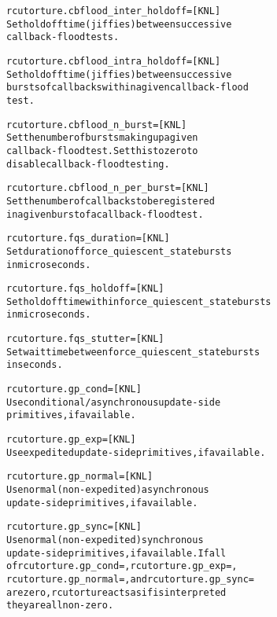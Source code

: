 \documentclass[a4paper,8pt,english]{sphinxmanual}
\begin{document}
\begin{alltt}
        rcutorture.cbflood\_inter\_holdoff= {[}KNL{]}
                        Set holdoff time (jiffies) between successive
                        callback-flood tests.

        rcutorture.cbflood\_intra\_holdoff= {[}KNL{]}
                        Set holdoff time (jiffies) between successive
                        bursts of callbacks within a given callback-flood
                        test.

        rcutorture.cbflood\_n\_burst= {[}KNL{]}
                        Set the number of bursts making up a given
                        callback-flood test.  Set this to zero to
                        disable callback-flood testing.

        rcutorture.cbflood\_n\_per\_burst= {[}KNL{]}
                        Set the number of callbacks to be registered
                        in a given burst of a callback-flood test.

        rcutorture.fqs\_duration= {[}KNL{]}
                        Set duration of force\_quiescent\_state bursts
                        in microseconds.

        rcutorture.fqs\_holdoff= {[}KNL{]}
                        Set holdoff time within force\_quiescent\_state bursts
                        in microseconds.

        rcutorture.fqs\_stutter= {[}KNL{]}
                        Set wait time between force\_quiescent\_state bursts
                        in seconds.

        rcutorture.gp\_cond= {[}KNL{]}
                        Use conditional/asynchronous update-side
                        primitives, if available.

        rcutorture.gp\_exp= {[}KNL{]}
                        Use expedited update-side primitives, if available.

        rcutorture.gp\_normal= {[}KNL{]}
                        Use normal (non-expedited) asynchronous
                        update-side primitives, if available.

        rcutorture.gp\_sync= {[}KNL{]}
                        Use normal (non-expedited) synchronous
                        update-side primitives, if available.  If all
                        of rcutorture.gp\_cond=, rcutorture.gp\_exp=,
                        rcutorture.gp\_normal=, and rcutorture.gp\_sync=
                        are zero, rcutorture acts as if is interpreted
                        they are all non-zero.


\end{alltt}
\end{document}

